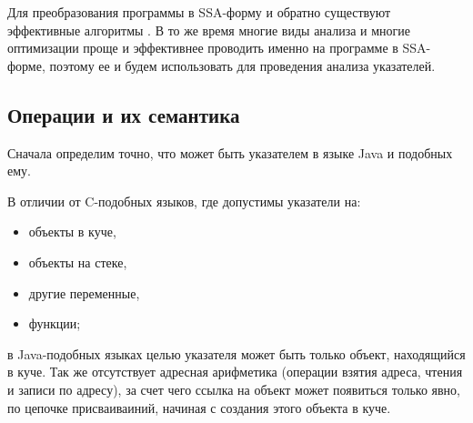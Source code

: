 \documentclass[14pt,titlepage]{extarticle}
\begin{document}
      Для преобразования программы в SSA-форму и обратно существуют эффективные
      алгоритмы \cite{ssa}. В то же время
      многие виды анализа и многие оптимизации проще и эффективнее проводить
      именно на программе в SSA-форме, поэтому ее и
      будем использовать для проведения анализа указателей.

    \subsection{Операции и их семантика}
      \label{section:instructions}

      Сначала определим точно, что может быть указателем в языке Java и
      подобных ему.

      В отличии от C-подобных языков, где допустимы указатели на:
      \begin{itemize}
        \item объекты в куче,
        \item объекты на стеке,
        \item другие переменные,
        \item функции;
      \end{itemize}
      в Java-подобных языках целью
      указателя может быть только объект, находящийся в куче. Так же
      отсутствует адресная арифметика (операции взятия адреса,
      чтения и записи по адресу), за счет чего ссылка на объект может
      появиться только явно, по цепочке присваиваиний, начиная с создания этого
      объекта в куче.
\end{document}
